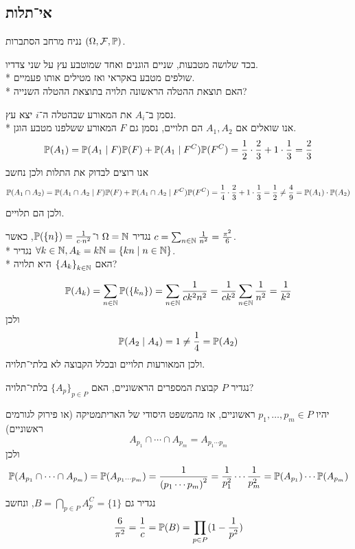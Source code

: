 \subsection{אי־תלות}
נניח מרחב הסתברות $(\Omega, \mathcal{F}, \mathbb{P})$.
\begin{exercise}
	בכד שלושה מטבעות, שניים הוגנים ואחד שמוטבע עץ על שני צדדיו. \\*
	שולפים מטבע באקראי ואז מטילים אותו פעמיים. \\*
	האם תוצאת ההטלה הראשונה תלויה בתוצאת ההטלה השנייה?
\end{exercise}
\begin{solution}
	נסמן ב־$A_i$ את המאורע שבהטלה ה־$i$ יצא עץ. \\*
	אנו שואלים אם $A_1, A_2$ הם תלויים, נסמן גם $F$ המאורע ששלפנו מטבע הוגן.
	\[
		\mathbb{P}(A_1)
		= \mathbb{P}(A_1 \mid F) \mathbb{P}(F) + \mathbb{P}(A_1 \mid F^C) \mathbb{P}(F^C)
		= \frac{1}{2} \cdot \frac{2}{3} + 1 \cdot \frac{1}{3} = \frac{2}{3}
	\]
	אנו רוצים לבדוק את התלות ולכן נחשב
	\[
		\mathbb{P}(A_1 \cap A_2)
		= \mathbb{P}(A_1 \cap A_2 \mid F) \mathbb{P}(F) + \mathbb{P}(A_1 \cap A_2 \mid F^C) \mathbb{P}(F^C)
		= \frac{1}{4} \cdot \frac{2}{3} + 1 \cdot \frac{1}{3} = \frac{1}{2} \ne \frac{4}{9} = \mathbb{P}(A_1) \cdot \mathbb{P}(A_2)
	\]
	ולכן הם תלויים.
\end{solution}
\begin{exercise}
	נגדיר $\Omega = \mathbb{N}$ ו־$\mathbb{P}(\{n\}) = \frac{1}{c \cdot n^2}$, כאשר $c = \sum_{n \in \mathbb{N}} \frac{1}{n^2} = \frac{\pi^2}{6}$. \\*
	נגדיר $\forall k \in \mathbb{N}, A_k = k \mathbb{N} = \{ kn \mid n \in \mathbb{N} \}$. \\*
	האם ${\{A_k\}}_{k \in \mathbb{N}}$ היא תלויה?
\end{exercise}
\begin{solution}
	\[
		\mathbb{P}(A_k) = \sum_{n \in \mathbb{N}} \mathbb{P}(\{k_n\})
		= \sum_{n \in \mathbb{N}} \frac{1}{c k^2 n^2}
		= \frac{1}{c k^2} \sum_{n \in \mathbb{N}} \frac{1}{n^2}
		= \frac{1}{k^2}
	\]
	ולכן
	\[
		\mathbb{P}(A_2 \mid A_4) = 1 \ne \frac{1}{4} = \mathbb{P}(A_2)
	\]
	ולכן המאורעות תלויים ובכלל הקבוצה לא בלתי־תלויה.
\end{solution}
\begin{exercise}
	נגדיר $P$ קבוצת המספרים הראשוניים, האם ${\{A_p\}}_{p \in P}$ בלתי־תלויה?
\end{exercise}
\begin{solution}
	יהיו $p_1, \dots, p_m \in P$ ראשוניים, אז מהמשפט היסודי של האריתמטיקה (או פירוק לגורמים ראשוניים)
	\[
		A_{p_1} \cap \cdots \cap A_{p_m} = A_{p_1 \cdots p_m}
	\]
	ולכן
	\[
		\mathbb{P}(A_{p_1} \cap \cdots \cap A_{p_m}) = \mathbb{P}(A_{p_1 \cdots p_m}) = \frac{1}{{(p_1 \cdots p_m)}^2}
		= \frac{1}{p_1^2} \cdots \frac{1}{p_m^2} = \mathbb{P}(A_{p_1}) \cdots \mathbb{P}(A_{p_m})
	\]
	נגדיר גם $B = \bigcap_{p \in P} A_p^C = \{ 1 \}$, ונחשב
	\[
		\frac{6}{\pi^2} = \frac{1}{c} = \mathbb{P}(B) = \prod_{p \in P} (1 - \frac{1}{p^2})
	\]
\end{solution}
